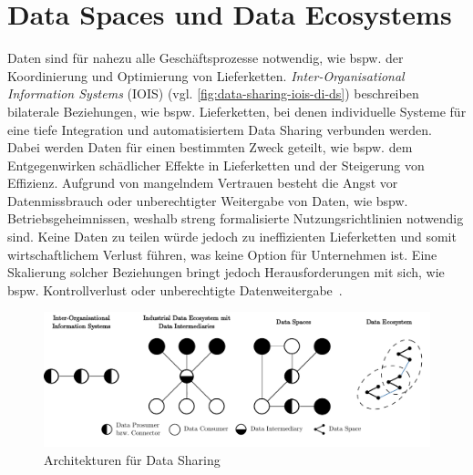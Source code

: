 
\section{Data Spaces und Data Ecosystems}

Daten sind für nahezu alle Geschäftsprozesse notwendig, wie bspw. der Koordinierung und Optimierung von Lieferketten.
\emph{Inter-Organisational Information Systems} (IOIS) (vgl. \autoref{fig:data-sharing-iois-di-ds}) beschreiben bilaterale Beziehungen, wie bspw. Lieferketten, bei denen individuelle Systeme für eine tiefe Integration und automatisiertem Data Sharing verbunden werden.
Dabei werden Daten für einen bestimmten Zweck geteilt, wie bspw. dem Entgegenwirken schädlicher Effekte in Lieferketten und der Steigerung von Effizienz.
Aufgrund von mangelndem Vertrauen besteht die Angst vor Datenmissbrauch oder unberechtigter Weitergabe von Daten, wie bspw. Betriebsgeheimnissen, weshalb streng formalisierte Nutzungsrichtlinien notwendig sind.
Keine Daten zu teilen würde jedoch zu ineffizienten Lieferketten und somit wirtschaftlichem Verlust führen, was keine Option für Unternehmen ist.
Eine Skalierung solcher Beziehungen bringt jedoch Herausforderungen mit sich, wie bspw. Kontrollverlust oder unberechtigte Datenweitergabe~\cite{mollerIndustrialDataEcosystems2024}.

\begin{figure}
    \includegraphics[width=\textwidth]{./assets/data_sharing_architectures.drawio.pdf}
    \caption{Architekturen für Data Sharing~\cite[vgl.][]{mollerIndustrialDataEcosystems2024}}
    \label{fig:data-sharing-iois-di-ds}
\end{figure}

